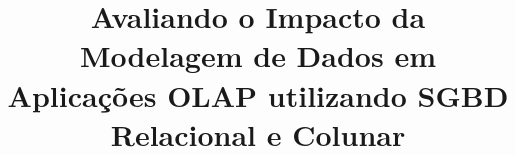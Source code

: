 \documentclass[conference]{IEEEtran}
\begin{document}
%
\title{Avaliando o Impacto da Modelagem de Dados em Aplicações OLAP utilizando SGBD Relacional e Colunar}



% 


\end{document}
